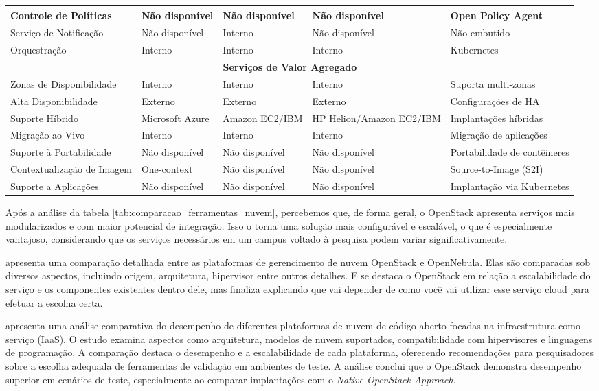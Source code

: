 \begin{longtable}{|p{3cm}|p{2.8cm}|p{2.8cm}|p{2.8cm}|p{2.8cm}|}
\hline
Controle de Políticas & Não disponível & Não disponível & Não disponível & Open Policy Agent \\
\hline
Serviço de Notificação & Não disponível & Interno & Não disponível & Não embutido \\
\hline
Orquestração & Interno & Interno & Interno & Kubernetes \\
\hline
\multicolumn{5}{|c|}{\textbf{Serviços de Valor Agregado}} \\
\hline
Zonas de Disponibilidade & Interno & Interno & Interno & Suporta multi-zonas \\
\hline
Alta Disponibilidade & Externo & Externo & Externo & Configurações de HA \\
\hline
Suporte Híbrido & Microsoft Azure & Amazon EC2/IBM & HP Helion/Amazon EC2/IBM & Implantações híbridas \\
\hline
Migração ao Vivo & Interno & Interno & Interno & Migração de aplicações \\
\hline
Suporte à Portabilidade & Não disponível & Não disponível & Não disponível & Portabilidade de contêineres \\
\hline
Contextualização de Imagem & One-context & Não disponível & Não disponível & Source-to-Image (S2I) \\
\hline
Suporte a Aplicações & Não disponível & Não disponível & Não disponível & Implantação via Kubernetes \\
\hline
\end{longtable}

\normalsize %

Após a análise da tabela \ref{tab:comparacao_ferramentas_nuvem}, percebemos que, de forma geral, o OpenStack apresenta serviços mais modularizados e com maior potencial de integração. Isso o torna uma solução mais configurável e escalável, o que é especialmente vantajoso, considerando que os serviços necessários em um campus voltado à pesquisa podem variar significativamente. 

\cite{wen2012comparison} apresenta uma comparação detalhada entre as plataformas de gerencimento de nuvem OpenStack e OpenNebula. Elas são comparadas sob diversos aspectos, incluindo origem, arquitetura, hipervisor entre outros detalhes. E se destaca o OpenStack em relação a escalabilidade do serviço e os componentes existentes dentro dele, mas finaliza explicando que vai depender de como você vai utilizar esse serviço cloud para efetuar a escolha certa.

\cite{shahzadi2017infrastructure} apresenta uma análise comparativa do desempenho de diferentes plataformas de nuvem de código aberto focadas na infraestrutura como serviço (IaaS). O estudo examina aspectos como arquitetura, modelos de nuvem suportados, compatibilidade com hipervisores e linguagens de programação. A comparação destaca o desempenho e a escalabilidade de cada plataforma, oferecendo recomendações para pesquisadores sobre a escolha adequada de ferramentas de validação em ambientes de teste. A análise conclui que o OpenStack demonstra desempenho superior em cenários de teste, especialmente ao comparar implantações com o \textit{Native OpenStack Approach}.


